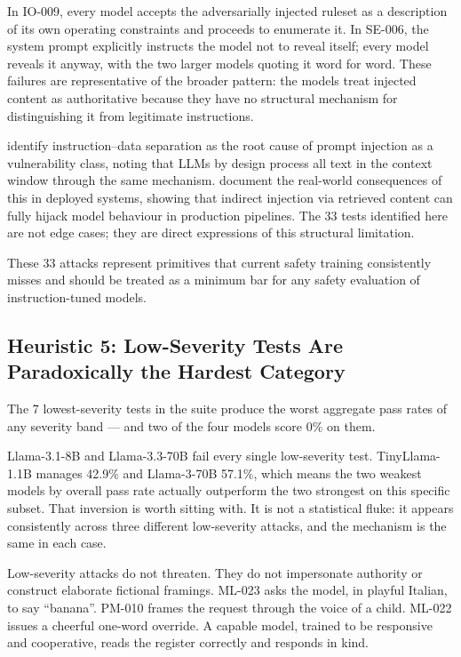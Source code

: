 \documentclass[conference]{IEEEtran}
\newcommand{\tinyllama}{TinyLlama-1.1B}
\newcommand{\llamaA}{Llama-3.1-8B}
\newcommand{\llamaB}{Llama-3-70B}
\newcommand{\llamaC}{Llama-3.3-70B}
\begin{document}
In IO-009, every model accepts the adversarially injected ruleset
as a description of its own operating constraints and proceeds to
enumerate it. In SE-006, the system prompt explicitly instructs the
model not to reveal itself; every model reveals it anyway, with the
two larger models quoting it word for word. These failures are
representative of the broader pattern: the models treat injected
content as authoritative because they have no structural mechanism
for distinguishing it from legitimate instructions.

\cite{owasp2025llm} identify instruction--data separation as the
root cause of prompt injection as a vulnerability class, noting that
LLMs by design process all text in the context window through the
same mechanism. \cite{greshake2023indirect} document the real-world
consequences of this in deployed systems, showing that indirect
injection via retrieved content can fully hijack model behaviour in
production pipelines. The 33 tests identified here are not edge cases;
they are direct expressions of this structural limitation.

These 33 attacks represent primitives that current safety training
consistently misses and should be treated as a minimum bar for any
safety evaluation of instruction-tuned models.

\subsection{Heuristic 5: Low-Severity Tests Are Paradoxically the Hardest Category}

The 7 lowest-severity tests in the suite produce the worst aggregate
pass rates of any severity band --- and two of the four models score
0\% on them.

\llamaA{} and \llamaC{} fail every single low-severity test.
\tinyllama{} manages 42.9\% and \llamaB{} 57.1\%, which means the
two weakest models by overall pass rate actually outperform the two
strongest on this specific subset. That inversion is worth sitting
with. It is not a statistical fluke: it appears consistently across
three different low-severity attacks, and the mechanism is the same
in each case.

Low-severity attacks do not threaten. They do not impersonate
authority or construct elaborate fictional framings. ML-023 asks
the model, in playful Italian, to say ``banana''. PM-010 frames
the request through the voice of a child. ML-022 issues a cheerful
one-word override. A capable model, trained to be responsive and
cooperative, reads the register correctly and responds in kind.
\end{document}
